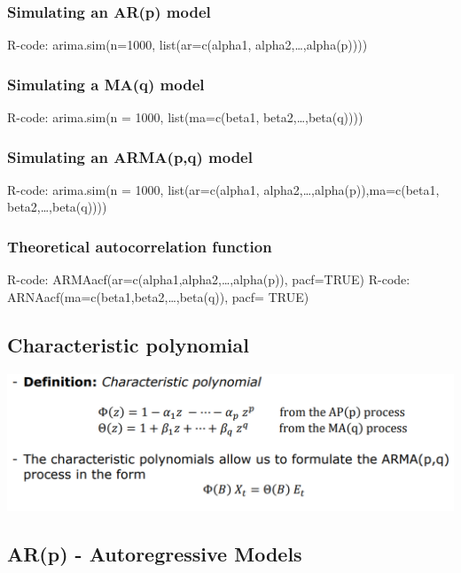\documentclass[
]{article}
\begin{document}
\hypertarget{simulating-an-arp-model}{%
\subsubsection{Simulating an AR(p)
model}\label{simulating-an-arp-model}}

R-code: arima.sim(n=1000, list(ar=c(alpha1, alpha2,\ldots,alpha(p))))

\hypertarget{simulating-a-maq-model}{%
\subsubsection{Simulating a MA(q) model}\label{simulating-a-maq-model}}

R-code: arima.sim(n = 1000, list(ma=c(beta1, beta2,\ldots,beta(q))))

\hypertarget{simulating-an-armapq-model}{%
\subsubsection{Simulating an ARMA(p,q)
model}\label{simulating-an-armapq-model}}

R-code: arima.sim(n = 1000, list(ar=c(alpha1,
alpha2,\ldots,alpha(p)),ma=c(beta1, beta2,\ldots,beta(q))))

\hypertarget{theoretical-autocorrelation-function}{%
\subsubsection{Theoretical autocorrelation
function}\label{theoretical-autocorrelation-function}}

R-code: ARMAacf(ar=c(alpha1,alpha2,\ldots,alpha(p)), pacf=TRUE) R-code:
ARNAacf(ma=c(beta1,beta2,\ldots,beta(q)), pacf= TRUE)

\hypertarget{characteristic-polynomial}{%
\subsection{Characteristic polynomial}\label{characteristic-polynomial}}

\includegraphics[width=0.75\linewidth]{poly}

\hypertarget{arp---autoregressive-models}{%
\subsection{AR(p) - Autoregressive
Models}\label{arp---autoregressive-models}}
\end{document}
